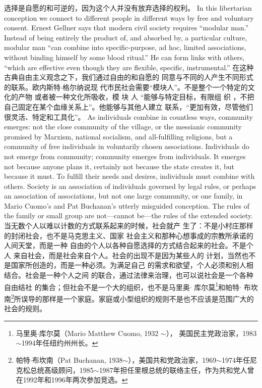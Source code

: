 \begin{paracol}{2}
选择是自愿的和可逆的，因为这个人并没有放弃选择的权利。
\switchcolumn*
In this libertarian conception we connect to different people
in different ways by free and voluntary consent. Ernest Gellner
says that modern civil society requires ``modular man.'' Instead
of being entirely the product of, and absorbed by, a particular
culture, modular man ``can combine into specific-purpose, ad
hoc, limited associations, without binding himself by some
blood ritual.'' He can form links with others, ``which are effective even though they are flexible, specific, instrumental.''
\switchcolumn
在这种古典自由主义观念之下，我们通过自由的和自愿的
同意与不同的人产生不同形式的联系。欧内斯特$\cdot$格尔纳说现
代市民社会需要“模块人”。不是整个一个特定的文化的产物
或者被一种文化所吸收，模 块 人 “能够与特定目标，有限组
织 ，不把自己固定在某个血缘关系上”。他能够与其他人建立
联系，“更加有效，尽管他们很灵活、特定和工具化”。
\switchcolumn*
As individuals combine in countless ways, community
emerges: not the close community of the village, or the messianic community promised by Marxism, national socialism,
and all-fulfilling religions, but a community of free individuals
in voluntarily chosen associations. Individuals do not emerge
from community; community emerges from individuals. It
emerges not because anyone plans it, certainly not because the
state creates it, but because it must. To fulfill their needs and
desires, individuals must combine with others. Society is an association of individuals governed by legal rules, or perhaps an
association of associations, but not one large community, or one
family, in Mario Cuomo's and Pat Buchanan's utterly misguided conception. The rules of the family or small group are
not---cannot be---the rules of the extended society.
\switchcolumn
当无数个人以难以计数的方式联系起来的时候，社会就产
生了：不是小村庄那样的封闭社会，也不是马克思主义、国家
社会主义和那种心想事成的宗教所承诺的人间天堂，而是一种
自由的个人以各种自愿选择的方式结合起来的社会。不是个人
来自社会，而是社会来自个人。社会的出现不是因为某些人的
计划，当然也不是国家所创造的，而是一种必须。为满足自己
的需求和欲望，个人必须和别人相结合。社会是一种个人之间
的联合，通过法律来治理，也可以说社会是一个各种自由结社
的集合；但社会不是一个大的组织，也不是马里奥$\cdot$ 库尔莫\footnote{马里奥$\cdot$库尔莫（Mario Matthew Cuomo, 1932 $\sim$）， 美国民主党政治家，1983$\sim$1994年任纽约州州长。}和帕特$\cdot$ 布坎南\footnote{帕特$\cdot$布坎南（Pat Buchanan, 1938$\sim$），美国共和党政治家，1969$\sim$1974年任尼克松总统髙级顾问，1985$\sim$1987年担任里根总统的联络主任，作为共和党人曾在1992年和1996年两次参加竞选。}所误导的那样是一个家庭。家庭或小型组织的规则不是也不应该是范围广大的社会的规则。

\end{paracol}

